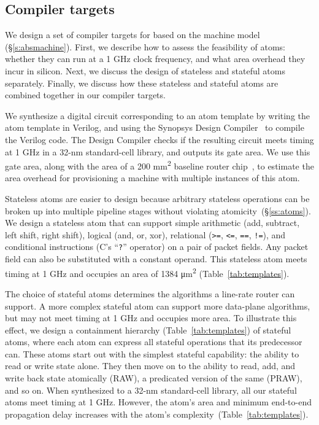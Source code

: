\subsection{Compiler targets}
\label{ss:targets}

We design a set of compiler targets for \pktlanguage based on the \absmachine
machine model (\S\ref{s:absmachine}). First, we describe how to assess the
feasibility of atoms: whether they can run at a 1 GHz clock frequency, and what
area overhead they incur in silicon. Next, we discuss the design of stateless
and stateful atoms separately. Finally, we discuss how these stateless and
stateful atoms are combined together in our compiler targets.

We synthesize a digital circuit corresponding to an atom template by writing
the atom template in Verilog, and using the Synopsys Design
Compiler~\cite{synopsys_dc} to compile the Verilog code. The Design Compiler
checks if the resulting circuit meets timing at 1 GHz in a 32-nm standard-cell
library, and outputs its gate area. We use this gate area, along with the area
of a 200 \si{\milli\metre\squared} baseline router chip~\cite{gibb_parsing},
to estimate the area overhead for provisioning a \absmachine machine with
multiple instances of this atom.


Stateless atoms are easier to design because arbitrary stateless operations can
be broken up into multiple pipeline stages without violating
atomicity~(\S\ref{ss:atoms}). We design a stateless atom that can support
simple arithmetic (add, subtract, left shift, right shift), logical (and, or,
xor), relational ({\tt >=}, {\tt <=}, {\tt ==}, {\tt !=}), and conditional
instructions (C's ``{\tt ?}'' operator) on a pair of packet fields. Any packet
field can also be substituted with a constant operand. This stateless atom
meets timing at 1 GHz and occupies an area of 1384 \si{\micro\meter\squared}
(Table~\ref{tab:templates}).

The choice of stateful atoms determines the algorithms a line-rate router can
support. A more complex stateful atom can support more data-plane algorithms,
but may not meet timing at 1 GHz and occupies more area. To illustrate this
effect, we design a containment hierarchy (Table~\ref{tab:templates}) of
stateful atoms, where each atom can express all stateful operations that its
predecessor can.  These atoms start out with the simplest stateful capability:
the ability to read or write state alone.  They then move on to the ability to
read, add, and write back state atomically (RAW), a predicated version of the
same (PRAW), and so on. When synthesized to a 32-nm standard-cell library, all
our stateful atoms meet timing at 1 GHz.  However, the atom's area and minimum
end-to-end propagation delay increases with the atom's
complexity~(Table~\ref{tab:templates}).

